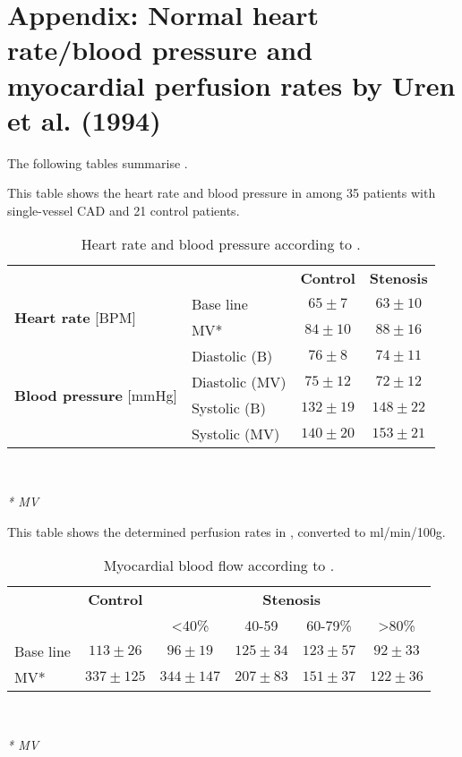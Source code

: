 \chapter{Appendix: Normal heart rate/blood pressure and myocardial perfusion rates by Uren et al. (1994)}\label{app:physoverview}
The following tables summarise \cite{uren1994relation}.
\begin{table}[h!]
\caption{Heart rate and blood pressure according to \cite{uren1994relation}.}
This table shows the heart rate and blood pressure in \citep{uren1994relation} among 35 patients with single-vessel \ac{CAD} and 21 control patients.
\begin{tabular}{l|l|cc|}
          \multicolumn{1}{c}{ } & \multicolumn{1}{c}{ } &  \multicolumn{1}{c}{\textbf{Control}} & \multicolumn{1}{c}{\textbf{Stenosis}} \\
          \cline{2-4}
\multirow{2}{*}{\textbf{Heart rate} [BPM]} &  Base line &  $65\pm 7$ &  $63\pm 10$  \\
& MV* &  $84\pm 10$ & $88\pm 16$   \\
\cline{2-4}
\multirow{4}{*}{\textbf{Blood pressure} [mmHg]} & Diastolic (B) & $76\pm 8$ & $74\pm 11$ \\
& Diastolic (MV)& $75\pm 12$ & $72 \pm 12$ \\
& Systolic (B) 	& $132\pm 19$ & $148\pm 22$ \\
& Systolic (MV) & $140\pm 20$ & $153\pm 21$ \\
\cline{2-4}
\end{tabular} \\
\raggedright
\textit{* \acf{MV}}
\label{tab:uren_physfact}
\end{table}

\begin{table}[h!]
\caption{Myocardial blood flow according to \cite{uren1994relation}.}
This table shows the determined perfusion rates in \citep{uren1994relation}, converted to ml/min/100g.\\
\begin{tabular}{l|c|c|c|c|c|}
          \multicolumn{1}{c}{ } & \multicolumn{1}{c}{\textbf{Control}} & \multicolumn{4}{c}{\textbf{Stenosis}}                             \\
        \multicolumn{1}{c}{ }  &    \multicolumn{1}{c}{ }     & \multicolumn{1}{c}{\textless{}40\%} & \multicolumn{1}{c}{40-59}\% & \multicolumn{1}{c}{60-79\%} & \multicolumn{1}{c}{\textgreater{}80\%} \\
          \hline
Base line &     $113\pm 26$    &         $96\pm 19$        &    $125\pm 34$     &    $123\pm 57$     &	$92\pm 33$\\
MV*        &     $337\pm 125$    &  $344\pm 147$  &   $207\pm 83$          &    $151\pm 37$     & $122\pm 36$ \\
\hline
\end{tabular} \\
\raggedright
\textit{* \acf{MV}}
\label{tab:urenFlows}
\end{table}